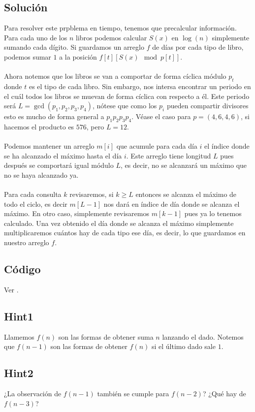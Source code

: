 \subsection*{Solución}
Para resolver este prpblema en tiempo, tenemos que precalcular información.  Para cada uno de los $n$ libros podemos calcular $S(x)$ en $\log(n)$ simplemente sumando cada dígito. Si guardamos un arreglo $f$ de días por cada tipo de libro, podemos sumar $1$ a la posición $f[t][S(x) \mod p[t]]$.
\\\\
Ahora notemos que los libros se van a comportar de forma cíclica módulo $p_t$ donde $t$ es el tipo de cada libro. Sin embargo, nos intersa encontrar un periodo en el cuál todos los libros se muevan de forma cíclica con respecto a él. Este periodo será $L=\gcd(p_1, p_2, p_3, p_4)$, nótese que como los $p_i$ pueden compartir divisores esto es mucho de forma general a $p_1p_2p_3p_4$. Véase el caso para $p=(4,6,4,6)$, si hacemos el producto es $576$, pero $L=12$.
\\\\Podemos mantener un arreglo $m[i]$ que acumule para cada día $i$ el índice donde se ha alcanzado el máximo hasta el día $i$. Este arreglo tiene longitud $L$ pues después se comportará igual módulo $L$, es decir, no se alcanzará un máximo que no se haya alcanzado ya.
\\\\Para cada consulta $k$ revisaremos, si $k \geq L$ entonces se alcanza el máximo de todo el ciclo, es decir $m[L-1]$ nos dará en índice de día donde se alcanza el máximo. En otro caso, simplemente revisaremos $m[k-1]$ pues ya lo tenemos calculado. Una vez obtenido el día donde se alcanza el máximo simplemente multiplicaremos cuántos hay de cada tipo ese día, es decir, lo que guardamos en nuestro arreglo $f$.
\subsection*{Código}
Ver .

\subsection*{Hint1}
Llamemos $f(n)$ son las formas de obtener suma $n$ lanzando el dado. Notemos que $f(n-1)$ son las formas de obtener $f(n)$ si el último dado sale $1$.
\subsection*{Hint2}
¿La observación de $f(n-1)$ también se cumple para $f(n-2)$? ¿Qué hay de $f(n-3)$?
